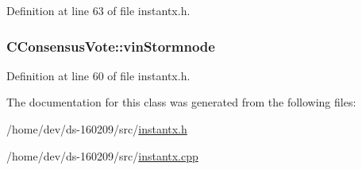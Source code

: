 Definition at line 63 of file instantx.\+h.

\hypertarget{class_c_consensus_vote_ab3a273669aecfba15f77c34d33c0ca93}{}
\subsubsection[{vin\+Stormnode}]{ C\+Consensus\+Vote\+::vin\+Stormnode}\label{class_c_consensus_vote_ab3a273669aecfba15f77c34d33c0ca93}


Definition at line 60 of file instantx.\+h.



The documentation for this class was generated from the following files\+:\begin{DoxyCompactItemize}
\item 
/home/dev/ds-\/160209/src/\hyperlink{instantx_8h}{instantx.\+h}\item 
/home/dev/ds-\/160209/src/\hyperlink{instantx_8cpp}{instantx.\+cpp}\end{DoxyCompactItemize}
